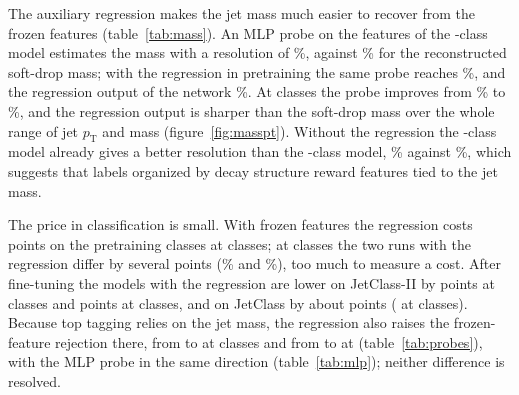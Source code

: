 The auxiliary regression makes the jet mass much easier to recover from the frozen features (table~\ref{tab:mass}).
An MLP probe on the features of the \Kres-class model estimates the mass with a resolution of \VResMlpRes\%, against
\VResSoftDrop\% for the reconstructed soft-drop mass; with the regression in pretraining the same probe reaches
\VResMlpResMass\%, and the regression output of the network \VResHeadResMass\%.
At \Kcoarse{} classes the probe improves from \VResMlpCoarse\% to \VResMlpCoarseMass\%, and the regression output is
sharper than the soft-drop mass over the whole range of jet $p_{\mathrm T}$ and mass (figure~\ref{fig:masspt}).
Without the regression the \Kcoarse-class model already gives a better resolution than the \Kfull-class model,
\VResMlpCoarse\% against \VResMlpFull\%, which suggests that labels organized by decay structure reward features tied
to the jet mass.


The price in classification is small.
With frozen features the regression costs \RevDLpMassRes{} points on the pretraining classes at \Kres{} classes; at
\Kcoarse{} classes the two runs with the regression differ by several points (\VLpJcTwoCoarseMassSOne\% and
\VLpJcTwoCoarseMassSTwo\%), too much to measure a cost.
After fine-tuning the models with the regression are lower on JetClass-II by \RevDFtMassRes{} points at \Kres{}
classes and \RevDFtMassCoarse{} points at \Kcoarse{} classes, and on JetClass by about \VDFtJcOneMassResOne{} points
(\RevDFtJcOneMassCoarse{} at \Kcoarse{} classes).
Because top tagging relies on the jet mass, the regression also raises the frozen-feature rejection there, from
\VLpTopRejCoarse{} to \VLpTopRejCoarseMass{} at \Kcoarse{} classes and from \VLpTopRejRes{} to \VLpTopRejResMass{} at
\Kres{} (table~\ref{tab:probes}), with the MLP probe in the same direction (table~\ref{tab:mlp}); neither difference is
resolved.
